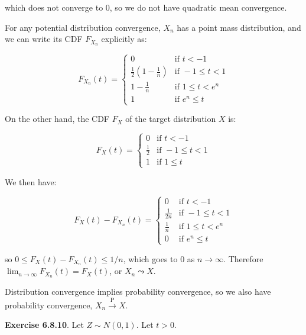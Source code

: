 which does not converge to 0, so we do not have quadratic mean
convergence.

For any potential distribution convergence, \(X_n\) has a point mass
distribution, and we can write its CDF \(F_{X_n}\) explicitly as:

\[
\begin{equation}
  F_{X_n}(t) =
    \begin{cases}
      0   & \text{if } t < -1 \\
      \frac{1}{2} \left(1 - \frac{1}{n}\right) & \text{if } -1 \leq t < 1 \\
      1 - \frac{1}{n} & \text{if } 1 \leq t < e^n \\
      1 & \text{if } e^n \leq t
    \end{cases}       
\end{equation}
\]

On the other hand, the CDF \(F_X\) of the target distribution \(X\) is:

\[
\begin{equation}
  F_X(t) =
    \begin{cases}
      0   & \text{if } t < -1 \\
      \frac{1}{2} & \text{if } -1 \leq t < 1 \\
      1 & \text{if } 1 \leq t
    \end{cases}       
\end{equation}
\]

We then have:

\[
\begin{equation}
  F_X(t) - F_{X_n}(t) =
    \begin{cases}
      0   & \text{if } t < -1 \\
      \frac{1}{2n} & \text{if } -1 \leq t < 1 \\
      \frac{1}{n} & \text{if } 1 \leq t < e^n \\
      0 & \text{if } e^n \leq t
    \end{cases}       
\end{equation}
\]

so \(0 \leq F_X(t) - F_{X_n}(t) \leq 1/n\), which goes to 0 as
\(n \rightarrow \infty\). Therefore
\(\lim _{n \rightarrow \infty} F_{X_n}(t) = F_X(t)\), or
\(X_n \leadsto X\).

Distribution convergence implies probability convergence, so we also
have probability convergence, \(X_n \xrightarrow{\text{P}} X\).

\textbf{Exercise 6.8.10}. Let \(Z \sim N(0, 1)\). Let \(t > 0\).

